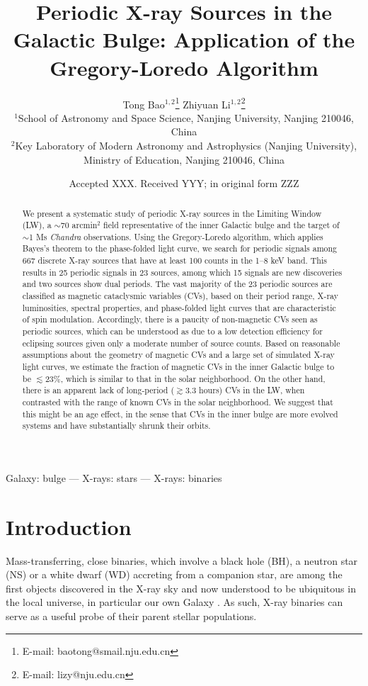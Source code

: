 \documentclass[fleqn,usenatbib]{mnras}
\title[Periodic X-ray Sources in the Galactic Bulge]{Periodic X-ray Sources in the Galactic Bulge: Application of the Gregory-Loredo Algorithm}
\author[Bao \& Li]{
Tong Bao$^{1,2}$\thanks{E-mail: baotong@smail.nju.edu.cn}
Zhiyuan Li$^{1,2}$\thanks{E-mail: lizy@nju.edu.cn}
\\
$^{1}$School of Astronomy and Space Science, Nanjing University, Nanjing 210046, China\\
$^{2}$Key Laboratory of Modern Astronomy and Astrophysics (Nanjing University), Ministry of Education, Nanjing 210046, China
}
\date{Accepted XXX. Received YYY; in original form ZZZ}
\begin{document}
\maketitle
\begin{abstract}
We present a systematic study of periodic X-ray sources in the Limiting Window (LW), a $\sim$70 arcmin$^2$ field representative of the inner Galactic bulge and the target of $\sim$1 Ms {\it Chandra} observations.  
Using the Gregory-Loredo algorithm, which applies Bayes's theorem to the phase-folded light curve, we search for periodic signals among 667 discrete X-ray sources that have at least 100 counts in the 1--8 keV band. 
This results in 25 periodic signals in 23 sources, among which 15 signals are new discoveries and two sources show dual periods. 
The vast majority of the 23 periodic sources are classified as magnetic cataclysmic variables (CVs), based on their period range, X-ray luminosities, spectral properties, and phase-folded light curves that are characteristic of spin modulation.
Accordingly, there is a paucity of non-magnetic CVs seen as periodic sources, which can be understood as due to a low detection efficiency for eclipsing sources given only a moderate number of source counts. 
Based on reasonable assumptions about the geometry of magnetic CVs and a large set of simulated X-ray light curves, we estimate the fraction of magnetic CVs in the inner Galactic bulge to be $\lesssim$23\%, which is similar to that in the solar neighborhood.
On the other hand, there is an apparent lack of long-period ($\gtrsim$3.3 hours) CVs in the LW, when contrasted with the range of known CVs in the solar neighborhood.
We suggest that this might be an age effect, in the sense that CVs in the inner bulge are more evolved systems and have substantially shrunk their orbits. 
\end{abstract}

\begin{keywords}
Galaxy: bulge --- X-rays: stars --- X-rays: binaries
\end{keywords}

\section{Introduction} \label{sec:intro}
Mass-transferring, close binaries, which involve a black hole (BH), a neutron star (NS) or a white dwarf (WD) accreting from a companion star, are among the first objects discovered in the X-ray sky and now understood to be ubiquitous in the local universe, in particular our own Galaxy \citep{2006ARA&A..44..323F}. 
As such, X-ray binaries can serve as a useful probe of their parent stellar populations.
\end{document}
